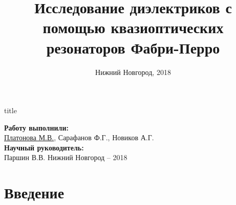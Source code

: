 
\newcommand{\sq}[1]{\tikz{\draw[draw=#1,fill=#1] (0,0) rectangle (0.7em,0.7em);}}
\usepackage{xcolor}
\title[]{Исследование диэлектриков с помощью квазиоптических резонаторов Фабри-Перро}
\date{Нижний Новгород, 2018}
\usepackage[makeroom]{cancel}
\usepackage{tabu}
  
% 
\begin{frame}[plain]
	\centering
	\vspace{1.2cm}
	\begin{beamercolorbox}[sep=8pt,center]{title}
		\bf{}\inserttitle
	\end{beamercolorbox}
	\vspace{0.5cm}
	\normalsize \textbf{Работу выполнили:}\\
	\large
	\underline{Платонова М.В.}, %
	{Сарафанов Ф.Г.}, %
	{Новиков А.Г.}
	\\ 
	\vspace{0.5cm}
	\normalsize{\textbf{Научный руководитель:}\\}
	\large{Паршин В.В.}
	\vfill
	\small{Нижний Новгород -- 2018}
\end{frame}

\section{Введение}
